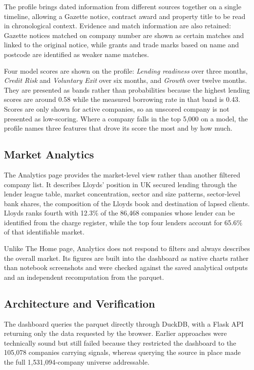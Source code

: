 \documentclass[    author={Samuel Menon Demelo; Sneha Saphala Ram Prasad; 
Viktor Ander Lindholm; Vishal Khatri},
               supervisor={Prof. Fernando Moreno-Pino},
                   degree={MSc},
                    title={Lloyds Commercial Banking Intelligence},
                 subtitle={Ranking SME Lending, Risk and Growth Prospects for Lloyds Banking Group},
                     type={},
                     year={2026}]{dissertation}
\begin{document}
The profile brings dated information from different sources together on a single timeline, allowing a Gazette notice, contract award and property title to be read in chronological context. Evidence and match information are also retained: Gazette notices matched on company number are shown as certain matches and linked to the original notice, while grants and trade marks based on name and postcode are identified as weaker name matches.

Four model scores are shown on the profile: \textit{Lending readiness} over three months, \textit{Credit Risk} and \textit{Voluntary Exit} over six months, and \textit{Growth} over twelve months. They are presented as bands rather than probabilities because the highest lending scores are around 0.58 while the measured borrowing rate in that band is 0.43. Scores are only shown for active companies, so an unscored company is not presented as low-scoring. Where a company falls in the top 5,000 on a model, the profile names three features that drove its score the most and by how much.

\subsection{Market Analytics}
The Analytics page provides the market-level view rather than another filtered company list. It describes Lloyds' position in UK secured lending through the lender league table, market concentration, sector and size patterns, sector-level bank shares, the composition of the Lloyds book and destination of lapsed clients. Lloyds ranks fourth with 12.3\% of the 
86,468 companies whose lender can be identified from the charge register, while the top four lenders account for 65.6\% of that identifiable market.

Unlike The Home page, Analytics does not respond to filters and always describes the overall market. Its figures are built into the dashboard as native charts rather than notebook screenshots and were checked against the saved analytical outputs and an independent recomputation from the parquet.

\subsection{Architecture and Verification}
The dashboard queries the parquet directly through DuckDB, with a Flask API returning only the data requested by the browser. Earlier approaches were technically sound but still failed because they restricted the dashboard to the 105,078 companies carrying signals, whereas querying the source in place made the full 1,531,094-company universe addressable.
\end{document}
